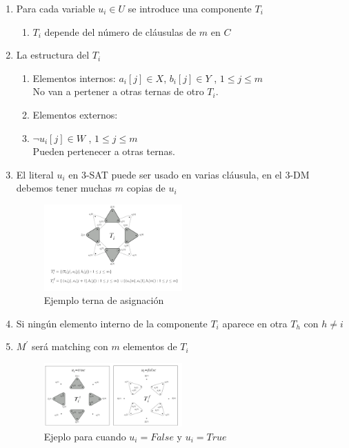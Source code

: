 \documentclass{article}
\begin{document}
\begin{enumerate}
    \item Para cada variable $u_i \in U$ se introduce una componente $T_i$
     \begin{enumerate}
        \item $T_i$ depende del número de cláusulas de $m$ en $C$
        
     \end{enumerate}
     \item La estructura del $T_i$
     \begin{enumerate}
        \item Elementos internos:
        $a_i[j]\in X$,  $b_i[j] \in Y$ , $1 \leq j \leq m$ \\
        No van a pertener a otras ternas de otro $T_i$.
        \item Elementos externos:
        \item $\lnot u_i[j] \in W$ ,  $1 \leq j \leq m$\\
        Pueden pertenecer a otras ternas.

     \end{enumerate}
     \item El literal $u_i$ en 3-SAT puede ser usado en varias cláusula, en el 3-DM debemos tener muchas $m$ copias de $u_i$
     \begin{figure}[H]
        \centering
        \includegraphics[width=0.5\textwidth]{photos/ejemplo_terna_asignacion.png}
        \caption{Ejemplo terna de asignación}
        \label{fig:etiqueta}


    \end{figure}
    
    \item Si ningún elemento interno de la componente $T_i$ aparece en otra $T_h$
con $h \neq i$
    \item $M^{'}$ será matching con $m$ elementos de $T_i$
    \begin{figure}[H]
        \centering
        \includegraphics[width=0.5\textwidth]{photos/ternas_asignacion_con_uifalse_ui_true.png}
        \caption{Ejeplo para cuando $u_i = False $ y $u_i = True$}
        \label{fig:etiqueta}
    \end{figure}


\end{enumerate}
\end{document}
